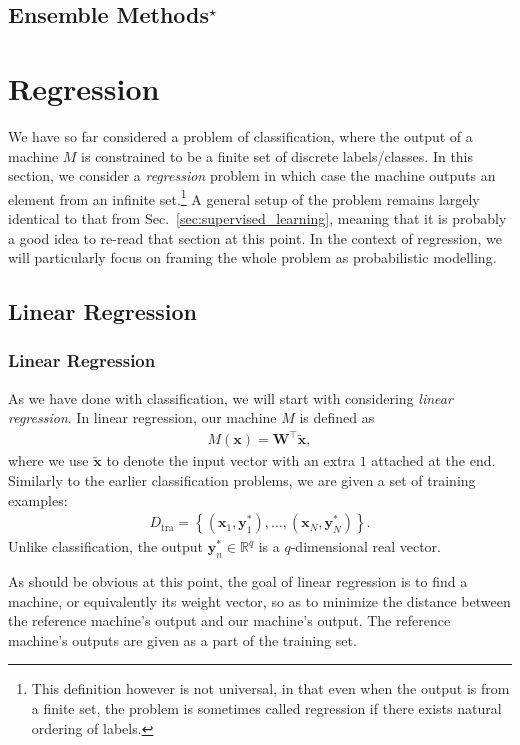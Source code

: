 \documentclass{report}
\newcommand{\vect}[1]{\mathbf{#1}}
\newcommand{\matr}[1]{\mathbf{#1}}
\newcommand{\vx}[0]{\vect{x}}
\newcommand{\vy}[0]{\vect{y}}
\newcommand{\mW}[0]{\matr{W}}
\newcommand{\RR}[0]{\mathbb{R}}
\newcommand{\tra}{\text{tra}}
\begin{document}
\section{Ensemble Methods$^\star$}


\chapter{Regression}
\label{sec:regression}

We have so far considered a problem of classification, where the output of a
machine $M$ is constrained to be a finite set of discrete labels/classes. In
this section, we consider a {\it regression} problem in which case the machine
outputs an element from an infinite set.\footnote{
    This definition however is not universal, in that even when the output is
    from a finite set, the problem is sometimes called regression if there
    exists natural ordering of labels.
} A general setup of the problem remains largely identical to that from
Sec.~\ref{sec:supervised_learning}, meaning that it is probably a good idea to
re-read that section at this point.  In the context of regression, we will
particularly focus on framing the whole problem as probabilistic modelling. 

\section{Linear Regression}
\label{sec:linear-regression}

\subsection{Linear Regression}

As we have done with classification, we will start with considering {\it linear
regression}. In linear regression, our machine $M$ is defined as 
\begin{align*}
    M(\vx) = \mW^\top \tilde{\vx},
\end{align*}
where we use $\tilde{\vx}$ to denote the input vector with an extra $1$ attached
at the end.  Similarly to the earlier classification problems, we are given a
set of training examples:
\begin{align*}
    D_{\tra} = \left\{ 
        (\vx_1, \vy_1^*), \ldots, (\vx_N, \vy_N^*)
    \right\}.
\end{align*}
Unlike classification, the output $\vy_n^* \in \RR^q$ is a $q$-dimensional real
vector. 

As should be obvious at this point, the goal of linear regression is to find a
machine, or equivalently its weight vector, so as to minimize the distance
between the reference machine's output and our machine's output. The reference
machine's outputs are given as a part of the training set.
\end{document}
